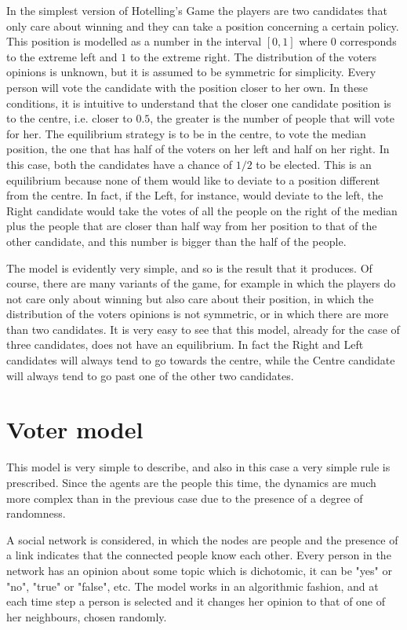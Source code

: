 \documentclass[11pt,a4paper,twocolumn]{article}
\begin{document}
In the simplest version of Hotelling's Game the players are two candidates that only care about winning and they can take a position concerning a certain policy. This position is modelled as a number in the interval $[0,1]$ where $0$ corresponds to the extreme left and $1$ to the extreme right. The distribution of the voters opinions is unknown, but it is assumed to be symmetric for simplicity. Every person will vote the candidate with the position closer to her own. In these conditions, it is intuitive to understand that the closer one candidate position is to the centre, i.e. closer to $0.5$, the greater is the number of people that will vote for her. 
The equilibrium strategy is to be in the centre, to vote the median position, the one that has half of the voters on her left and half on her right. In this case, both the candidates have a chance of $1/2$ to be elected. This is an equilibrium because none of them would like to deviate to a position different from the centre. In fact, if the Left, for instance, would deviate to the left, the Right candidate would take the votes of all the people on the right of the median plus the people that are closer than half way from her position to that of the other candidate, and this number is bigger than the half of the people.

The model is evidently very simple, and so is the result that it produces. Of course, there are many variants of the game, for example in which the players do not care only about winning but also care about their position, in which the distribution of the voters opinions is not symmetric, or in which there are more than two candidates. It is very easy to see that this model, already for the case of three candidates, does not have an equilibrium. In fact the Right and Left candidates will always tend to go towards the centre, while the Centre candidate will always tend to go past one of the other two candidates.

\section*{Voter model}
\vspace*{-0.2cm}
This model is very simple to describe, and also in this case a very simple rule is prescribed. Since the agents are the people this time, the dynamics are much more complex than in the previous case due to the presence of a degree of randomness. 

A social network is considered, in which the nodes are people and the presence of a link indicates that the connected people know each other. Every person in the network has an opinion about some topic which is dichotomic, it can be "yes" or "no", "true" or "false", etc. The model works in an algorithmic fashion, and at each time step a person is selected and it changes her opinion to that of one of her neighbours, chosen randomly.
\end{document}

